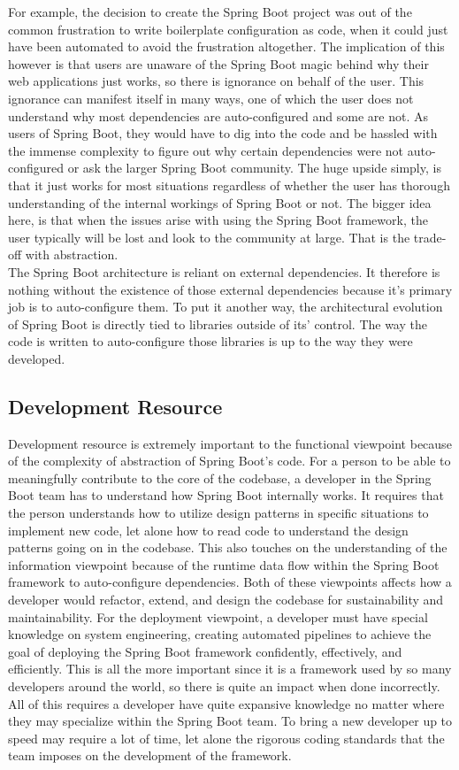 For example, the decision to create the Spring Boot project was out of the common frustration to write boilerplate configuration as code, when it could just have been automated to avoid the frustration altogether. The implication of this however is that users are unaware of the Spring Boot magic behind why their web applications just works, so there is ignorance on behalf of the user. This ignorance can manifest itself in many ways, one of which the user does not understand why most dependencies are auto-configured and some are not. As users of Spring Boot, they would have to dig into the code and be hassled with the immense complexity to figure out why certain dependencies were not auto-configured or ask the larger Spring Boot community. The huge upside simply, is that it just works for most situations regardless of whether the user has thorough understanding of the internal workings of Spring Boot or not. The bigger idea here, is that when the issues arise with using the Spring Boot framework, the user typically will be lost and look to the community at large. That is the trade-off with abstraction.\\

The Spring Boot architecture is reliant on external dependencies. It therefore is nothing without the existence of those external dependencies because it's primary job is to auto-configure them. To put it another way, the architectural evolution of Spring Boot is directly tied to libraries outside of its' control. The way the code is written to auto-configure those libraries is up to the way they were developed.

\subsection{Development Resource}
Development resource is extremely important to the functional viewpoint because of the complexity of abstraction of Spring Boot's code. For a person to be able to meaningfully contribute to the core of the codebase, a developer in the Spring Boot team has to understand how Spring Boot internally works. It requires that the person understands how to utilize design patterns in specific situations to implement new code, let alone how to read code to understand the design patterns going on in the codebase. This also touches on the understanding of the information viewpoint because of the runtime data flow within the Spring Boot framework to auto-configure dependencies. Both of these viewpoints affects how a developer would refactor, extend, and design the codebase for sustainability and maintainability. For the deployment viewpoint, a developer must have special knowledge on system engineering, creating automated pipelines to achieve the goal of deploying the Spring Boot framework confidently, effectively, and efficiently. This is all the more important since it is a framework used by so many developers around the world, so there is quite an impact when done incorrectly. All of this requires a developer have quite expansive knowledge no matter where they may specialize within the Spring Boot team. To bring a new developer up to speed may require a lot of time, let alone the rigorous coding standards that the team imposes on the development of the framework.
